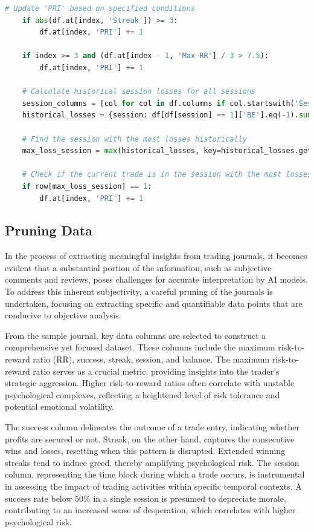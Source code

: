 \documentclass{article}
\begin{document}
\begin{lstlisting}[language=Python, caption={Calculating PRI}, label={lst:python}]
# Update 'PRI' based on specified conditions
    if abs(df.at[index, 'Streak']) >= 3:
        df.at[index, 'PRI'] += 1
    
    if index >= 3 and (df.at[index - 1, 'Max RR'] / 3 > 7.5):
        df.at[index, 'PRI'] += 1
    
    # Calculate historical session losses for all sessions
    session_columns = [col for col in df.columns if col.startswith('Session_')]
    historical_losses = {session: df[df[session] == 1]['BE'].eq(-1).sum() for session in session_columns}
    
    # Find the session with the most losses historically
    max_loss_session = max(historical_losses, key=historical_losses.get)
    
    # Check if the current trade is in the session with the most losses historically
    if row[max_loss_session] == 1:
        df.at[index, 'PRI'] += 1
\end{lstlisting}



\subsection{Pruning Data}
In the process of extracting meaningful insights from trading journals, it becomes evident that a substantial portion of the information, such as subjective comments and reviews, poses challenges for accurate interpretation by AI models. To address this inherent subjectivity, a careful pruning of the journals is undertaken, focusing on extracting specific and quantifiable data points that are conducive to objective analysis.

From the sample journal, key data columns are selected to construct a comprehensive yet focused dataset. These columns include the maximum risk-to-reward ratio (RR), success, streak, session, and balance. The maximum risk-to-reward ratio serves as a crucial metric, providing insights into the trader's strategic aggression. Higher risk-to-reward ratios often correlate with unstable psychological complexes, reflecting a heightened level of risk tolerance and potential emotional volatility.

The success column delineates the outcome of a trade entry, indicating whether profits are secured or not. Streak, on the other hand, captures the consecutive wins and losses, resetting when this pattern is disrupted. Extended winning streaks tend to induce greed, thereby amplifying psychological risk. The session column, representing the time block during which a trade occurs, is instrumental in assessing the impact of trading activities within specific temporal contexts. A success rate below 50\% in a single session is presumed to depreciate morale, contributing to an increased sense of desperation, which correlates with higher psychological risk.
\end{document}
